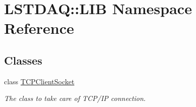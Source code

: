 \hypertarget{namespace_l_s_t_d_a_q_1_1_l_i_b}{}\section{L\+S\+T\+D\+A\+Q\+:\+:L\+I\+B Namespace Reference}
\label{namespace_l_s_t_d_a_q_1_1_l_i_b}
\subsection*{Classes}
\begin{DoxyCompactItemize}
\item 
class \hyperlink{class_l_s_t_d_a_q_1_1_l_i_b_1_1_t_c_p_client_socket}{T\+C\+P\+Client\+Socket}
\begin{DoxyCompactList}\small\item\em The class to take care of T\+C\+P/\+I\+P connection. \end{DoxyCompactList}\end{DoxyCompactItemize}
